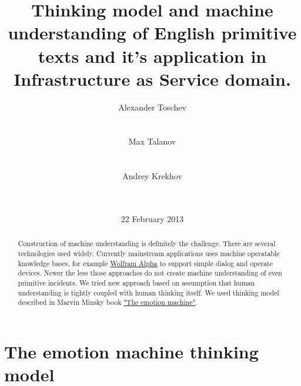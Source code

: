 \documentclass{acm_proc_article-sp}
\begin{document}
\title{Thinking model and machine understanding of English primitive texts and it's application in Infrastructure as Service domain.}

\author{
\alignauthor Alexander Toschev\\
       \\
       \\
\alignauthor Max Talanov\\
       \\
       \\
\alignauthor Andrey Krekhov\\
       \\
       \\
}

\date{22 February 2013}

\maketitle

\begin{abstract}

Construction of machine understanding is definitely the challenge. There are several technologies used widely.
Currently mainstream applications uses machine operatable knowledge bases, for example \href{http://www.wolframalpha.com}{Wolfram Alpha}\cite{wolfram_alpha} to support simple dialog and operate devices.
Newer the less those approaches do not create machine understanding of even primitive incidents.
We tried new approach based on assumption that human understanding is tightly coupled with human thinking itself.
We used thinking model described in Marvin Minsky book \href{http://en.wikipedia.org/wiki/The_Emotion_Machine}{"The emotion machine"}\cite{minsk}.


\end{abstract}

\section{The emotion machine thinking model}
\end{document}
